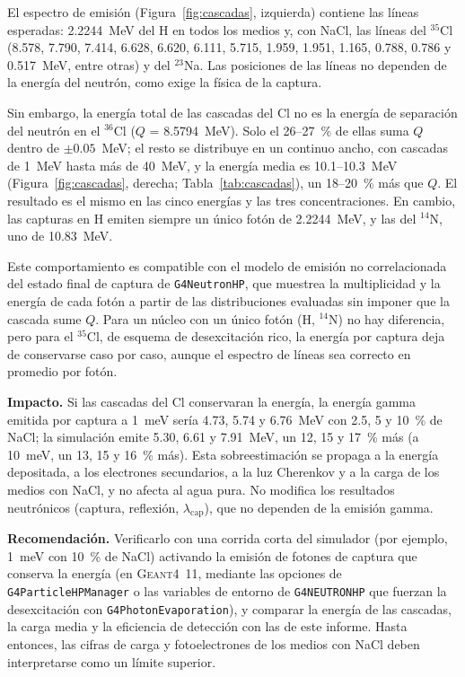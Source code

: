 \documentclass[11pt,a4paper]{article}
\begin{document}
El espectro de emisión (Figura~\ref{fig:cascadas}, izquierda) contiene las líneas esperadas: 2.2244~MeV del H en todos los medios y, con NaCl, las líneas del $^{35}$Cl (8.578, 7.790, 7.414, 6.628, 6.620, 6.111, 5.715, 1.959, 1.951, 1.165, 0.788, 0.786 y 0.517~MeV, entre otras) y del $^{23}$Na. Las posiciones de las líneas no dependen de la energía del neutrón, como exige la física de la captura.

Sin embargo, la energía total de las cascadas del Cl no es la energía de separación del neutrón en el $^{36}$Cl ($Q$ = 8.5794~MeV). Solo el 26--27~\% de ellas suma $Q$ dentro de $\pm0.05$~MeV; el resto se distribuye en un continuo ancho, con cascadas de 1~MeV hasta más de 40~MeV, y la energía media es 10.1--10.3~MeV (Figura~\ref{fig:cascadas}, derecha; Tabla~\ref{tab:cascadas}), un 18--20~\% más que $Q$. El resultado es el mismo en las cinco energías y las tres concentraciones. En cambio, las capturas en H emiten siempre un único fotón de 2.2244~MeV, y las del $^{14}$N, uno de 10.83~MeV.

Este comportamiento es compatible con el modelo de emisión no correlacionada del estado final de captura de \texttt{G4NeutronHP}, que muestrea la multiplicidad y la energía de cada fotón a partir de las distribuciones evaluadas sin imponer que la cascada sume $Q$. Para un núcleo con un único fotón (H, $^{14}$N) no hay diferencia, pero para el $^{35}$Cl, de esquema de desexcitación rico, la energía por captura deja de conservarse caso por caso, aunque el espectro de líneas sea correcto en promedio por fotón.

\textbf{Impacto.} Si las cascadas del Cl conservaran la energía, la energía gamma emitida por captura a 1~meV sería 4.73, 5.74 y 6.76~MeV con 2.5, 5 y 10~\% de NaCl; la simulación emite 5.30, 6.61 y 7.91~MeV, un 12, 15 y 17~\% más (a 10~meV, un 13, 15 y 16~\% más). Esta sobreestimación se propaga a la energía depositada, a los electrones secundarios, a la luz Cherenkov y a la carga de los medios con NaCl, y no afecta al agua pura. No modifica los resultados neutrónicos (captura, reflexión, $\lambda_\mathrm{cap}$), que no dependen de la emisión gamma.

\textbf{Recomendación.} Verificarlo con una corrida corta del simulador (por ejemplo, 1~meV con 10~\% de NaCl) activando la emisión de fotones de captura que conserva la energía (en \textsc{Geant4}~11, mediante las opciones de \texttt{G4ParticleHPManager} o las variables de entorno de \texttt{G4NEUTRONHP} que fuerzan la desexcitación con \texttt{G4PhotonEvaporation}), y comparar la energía de las cascadas, la carga media y la eficiencia de detección con las de este informe. Hasta entonces, las cifras de carga y fotoelectrones de los medios con NaCl deben interpretarse como un límite superior.
\end{document}

